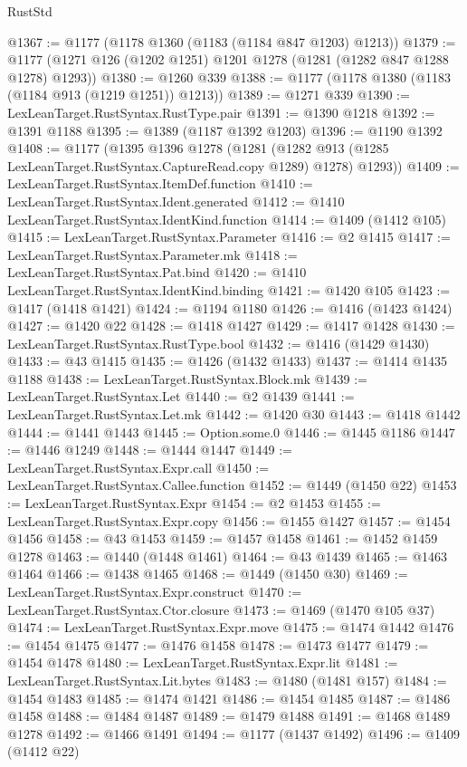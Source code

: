 \begin{lexlean}{RustStd}
\begin{coremodule}
@1367 := @1177 (@1178 @1360 (@1183 (@1184 @847 @1203) @1213))
@1379 := @1177 (@1271 @126 (@1202 @1251) @1201 @1278 (@1281 (@1282 @847 @1288 @1278) @1293))
@1380 := @1260 @339
@1388 := @1177 (@1178 @1380 (@1183 (@1184 @913 (@1219 @1251)) @1213))
@1389 := @1271 @339
@1390 := LexLeanTarget.RustSyntax.RustType.pair
@1391 := @1390 @1218
@1392 := @1391 @1188
@1395 := @1389 (@1187 @1392 @1203)
@1396 := @1190 @1392
@1408 := @1177
    (@1395
      @1396
      @1278
      (@1281 (@1282 @913 (@1285 LexLeanTarget.RustSyntax.CaptureRead.copy @1289) @1278) @1293))
@1409 := LexLeanTarget.RustSyntax.ItemDef.function
@1410 := LexLeanTarget.RustSyntax.Ident.generated
@1412 := @1410 LexLeanTarget.RustSyntax.IdentKind.function
@1414 := @1409 (@1412 @105)
@1415 := LexLeanTarget.RustSyntax.Parameter
@1416 := @2 @1415
@1417 := LexLeanTarget.RustSyntax.Parameter.mk
@1418 := LexLeanTarget.RustSyntax.Pat.bind
@1420 := @1410 LexLeanTarget.RustSyntax.IdentKind.binding
@1421 := @1420 @105
@1423 := @1417 (@1418 @1421)
@1424 := @1194 @1180
@1426 := @1416 (@1423 @1424)
@1427 := @1420 @22
@1428 := @1418 @1427
@1429 := @1417 @1428
@1430 := LexLeanTarget.RustSyntax.RustType.bool
@1432 := @1416 (@1429 @1430)
@1433 := @43 @1415
@1435 := @1426 (@1432 @1433)
@1437 := @1414 @1435 @1188
@1438 := LexLeanTarget.RustSyntax.Block.mk
@1439 := LexLeanTarget.RustSyntax.Let
@1440 := @2 @1439
@1441 := LexLeanTarget.RustSyntax.Let.mk
@1442 := @1420 @30
@1443 := @1418 @1442
@1444 := @1441 @1443
@1445 := Option.some.{0}
@1446 := @1445 @1186
@1447 := @1446 @1249
@1448 := @1444 @1447
@1449 := LexLeanTarget.RustSyntax.Expr.call
@1450 := LexLeanTarget.RustSyntax.Callee.function
@1452 := @1449 (@1450 @22)
@1453 := LexLeanTarget.RustSyntax.Expr
@1454 := @2 @1453
@1455 := LexLeanTarget.RustSyntax.Expr.copy
@1456 := @1455 @1427
@1457 := @1454 @1456
@1458 := @43 @1453
@1459 := @1457 @1458
@1461 := @1452 @1459 @1278
@1463 := @1440 (@1448 @1461)
@1464 := @43 @1439
@1465 := @1463 @1464
@1466 := @1438 @1465
@1468 := @1449 (@1450 @30)
@1469 := LexLeanTarget.RustSyntax.Expr.construct
@1470 := LexLeanTarget.RustSyntax.Ctor.closure
@1473 := @1469 (@1470 @105 @37)
@1474 := LexLeanTarget.RustSyntax.Expr.move
@1475 := @1474 @1442
@1476 := @1454 @1475
@1477 := @1476 @1458
@1478 := @1473 @1477
@1479 := @1454 @1478
@1480 := LexLeanTarget.RustSyntax.Expr.lit
@1481 := LexLeanTarget.RustSyntax.Lit.bytes
@1483 := @1480 (@1481 @157)
@1484 := @1454 @1483
@1485 := @1474 @1421
@1486 := @1454 @1485
@1487 := @1486 @1458
@1488 := @1484 @1487
@1489 := @1479 @1488
@1491 := @1468 @1489 @1278
@1492 := @1466 @1491
@1494 := @1177 (@1437 @1492)
@1496 := @1409 (@1412 @22)

\end{coremodule}
\end{lexlean}
